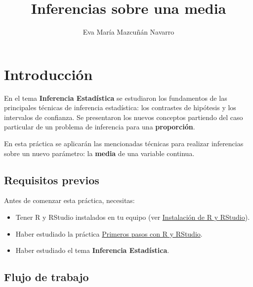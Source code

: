 \documentclass[
  title=normal,
  notoc,
  nobib,
  degree=mecinf]{mnye}
\title{Inferencias sobre una media}
\author{Eva María Mazcuñán Navarro}
\date{}
\begin{document}
\maketitle

%

{
\hypersetup{linkcolor=etoccolor}
\setcounter{tocdepth}{2}
\tableofcontents
}
\hypertarget{section}{%
\section*{}\label{section}}

\hypertarget{intro}{%
\section*{Introducción}\label{intro}}

En el tema \textbf{Inferencia Estadística} se estudiaron los fundamentos de las principales técnicas de inferencia estadística: los contrastes de hipótesis y los intervalos de confianza. Se presentaron los nuevos conceptos partiendo del caso particular de un problema de inferencia para una \textbf{proporción}.

En esta práctica se aplicarán las mencionadas técnicas para realizar inferencias sobre un nuevo parámetro: la \textbf{media} de una variable continua.

\hypertarget{prerequisites}{%
\subsection*{Requisitos previos}\label{prerequisites}}

Antes de comenzar esta práctica, necesitas:

\begin{itemize}
\item
  Tener \textsf{R} y \textsf{RStudio} instalados en tu equipo (ver \href{https://emazcunan.github.io/install-r-rstudio/}{Instalación de R y RStudio}).
\item
  Haber estudiado la práctica \href{https://emazcunan.github.io/basics-r-rstudio/}{Primeros pasos con R y RStudio}.
\item
  Haber estudiado el tema \textbf{Inferencia Estadística}.
\end{itemize}

\hypertarget{workflow}{%
\subsection*{Flujo de trabajo}\label{workflow}}
\end{document}
